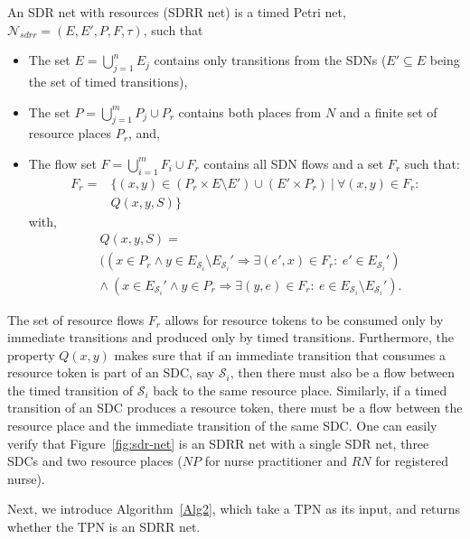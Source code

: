 \begin{mydef}  \label{def:sdr-net}
	An SDR net with resources (SDRR net) is a timed Petri net, 
	$\mathcal{N}_{sdrr} = (E, E', P , F, \tau)$, such that 
	\begin{itemize}
		\item The set \small $E = \bigcup_{j=1}^n E_j$ contains only transitions from the SDNs ($E' \subseteq E$ being 
		the set of timed transitions), 
		\item The set \small $P = \bigcup_{j=1}^m P_j \cup P_{r}$ contains both places from $N$ 
		and a finite set of resource places $P_{r}$, and, 
		\item The flow set \small $F = \bigcup_{i=1}^m F_i \cup F_r$ contains		
		all SDN 
		flows and a set $F_r$ 
		such that:  
		\small
		\begin{align*}
		F_r = &\{ (x,y) \in (P_r \times E \setminus E') \cup
		(E' \times P_r) \ | \ \forall (x,y) \in F_r: \\  &Q(x,y,S) \}
		\end{align*}
		with, \small \begin{align*} &Q(x,y,S) =\\ 
		&((x \in P_r \land y \in E_{\mathcal{S}_i} \setminus E_{\mathcal{S}_i}'  \Rightarrow \exists (e',x) \in F_r: \ e' \in E_{\mathcal{S}_i}') \\
		& \land \ (x \in E_{\mathcal{S}_i}' \land y \in P_r \Rightarrow \exists (y,e) \in F_r: \ e \in E_{\mathcal{S}_i} \setminus E_{\mathcal{S}_i}').\end{align*}
	\end{itemize}
\end{mydef} The set of resource flows $F_r$ allows for resource tokens to be consumed only by immediate transitions and produced 
only by timed transitions. Furthermore, the property $Q(x,y)$ makes sure that 
if an immediate 
transition that consumes a resource token 
is part of an SDC, say $\mathcal{S}_i$, then there must 
also be a flow between the timed transition of $\mathcal{S}_i$ back
to the same resource place. Similarly, if a timed transition of an SDC produces a resource 
token, there must be a flow between the resource 
place and the immediate transition of the same SDC.
One
can easily verify that Figure~\ref{fig:sdr-net} 
is an SDRR net with a single SDR net, three SDCs and two resource places 
($NP$ for nurse practitioner and $RN$ for registered nurse). 


Next, we introduce Algorithm~\ref{Alg2},
which  
take a TPN as its input, and returns
whether the TPN is an SDRR net. 


